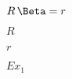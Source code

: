 \documentclass{article}
\begin{document}
$ R\,\Beta = r $
\pagebreak

$R$
\pagebreak

$r$
\pagebreak

$Ex_1$
\pagebreak
\end{document}
